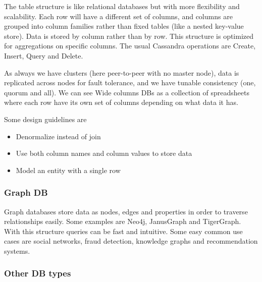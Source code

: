 The table structure is like relational databases but with more flexibility and scalability. Each row will have a different set of columns, and columns are grouped into column families rather than fixed tables (like a nested key-value store). Data is stored by column rather than by row. This structure is optimized for aggregations on specific columns. The usual Cassandra operations are Create, Insert, Query and Delete. 

\vspace{10pt}

As always we have clusters (here peer-to-peer with no master node), data is replicated across nodes for fault tolerance, and we have tunable consistency (one, quorum and all). We can see Wide columns DBs as a collection of spreadsheets where each row have its own set of columns depending on what data it has. 

\vspace{10pt}

Some design guidelines are 
\begin{itemize}
    \item Denormalize instead of join
    \item Use both column names and column values to store data
    \item Model an entity with a single row
\end{itemize}


\subsubsection{Graph DB}

Graph databases store data as nodes, edges and properties in order to traverse relationships easily. Some examples are Neo4j, JanusGraph and TigerGraph. With this structure queries can be fast and intuitive. Some easy common use cases are social networks, fraud detection, knowledge graphs and recommendation systems. 


\subsubsection{Other DB types} 

